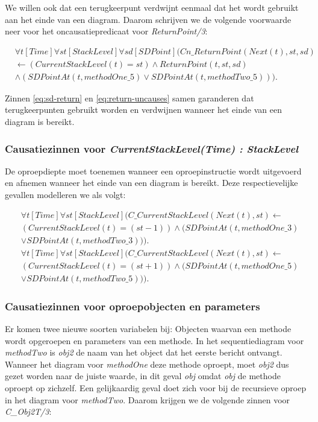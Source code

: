 We willen ook dat een terugkeerpunt verdwijnt eenmaal dat het wordt gebruikt aan het einde van een diagram. Daarom schrijven we de volgende voorwaarde neer voor het oncausatiepredicaat voor \textit{ReturnPoint/3}:

\begin{align}
 \nonumber &\forall{t}[Time]\forall{st}[StackLevel]\forall{sd}[SDPoint](Cn\_ReturnPoint(Next(t), st, sd) \\ \nonumber &\leftarrow (CurrentStackLevel(t) = st) \land ReturnPoint(t, st, sd) \\ &\land (SDPointAt(t, methodOne\_5) \lor SDPointAt(t, methodTwo\_5))).\label{eq:return-uncauses}
\end{align}

Zinnen \ref{eq:sd-return} en \ref{eq:return-uncauses} samen garanderen dat terugkeerpunten gebruikt worden en verdwijnen wanneer het einde van een diagram is bereikt.

\subsubsection{Causatiezinnen voor \textit{CurrentStackLevel(Time) : StackLevel}}

De oproepdiepte moet toenemen wanneer een oproepinstructie wordt uitgevoerd en afnemen wanneer het einde van een diagram is bereikt. Deze respectievelijke gevallen modelleren we als volgt:

\begin{align}
	\nonumber &\forall{t}[Time]\forall{st}[StackLevel](C\_CurrentStackLevel(Next(t), st) \leftarrow \\ \nonumber &(CurrentStackLevel(t) = (st-1)) \land (SDPointAt(t, methodOne\_3) \\ &\lor SDPointAt(t, methodTwo\_3))). \\
	\nonumber &\forall{t}[Time]\forall{st}[StackLevel](C\_CurrentStackLevel(Next(t), st) \leftarrow \\ \nonumber &(CurrentStackLevel(t) = (st+1)) \land (SDPointAt(t, methodOne\_5) \\ &\lor SDPointAt(t, methodTwo\_5))).
\end{align}

\subsubsection{Causatiezinnen voor oproepobjecten en parameters}
Er komen twee nieuwe soorten variabelen bij: Objecten waarvan een methode wordt opgeroepen en parameters van een methode. In het sequentiediagram voor \textit{methodTwo} is \textit{obj2} de naam van het object dat het eerste bericht ontvangt. Wanneer het diagram voor \textit{methodOne} deze methode oproept, moet \textit{obj2} dus gezet worden naar de juiste waarde, in dit geval \textit{obj} omdat \textit{obj} de methode oproept op zichzelf. Een gelijkaardig geval doet zich voor bij de recursieve oproep in het diagram voor \textit{methodTwo}. Daarom krijgen we de volgende zinnen voor \textit{C\_Obj2T/3}:

